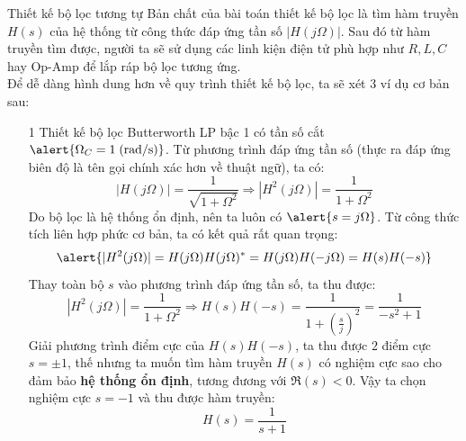 \documentclass[8pt]{beamer}
\begin{document}
\begin{frame}{Thiết kế bộ lọc tương tự}
	Bản chất của bài toán thiết kế bộ lọc là tìm \alert{hàm truyền $H(s)$} của hệ thống từ công thức đáp ứng tần số $|H(j\Omega)|$. Sau đó từ hàm truyền tìm được, người ta sẽ sử dụng các linh kiện điện tử phù hợp như $R,L,C$ hay Op-Amp để lắp ráp bộ lọc tương ứng.
\\ Để dễ dàng hình dung hơn về quy trình thiết kế bộ lọc, ta sẽ xét 3 ví dụ cơ bản sau:
\begin{enumerate}
	\item[1] Thiết kế bộ lọc Butterworth LP bậc 1 có tần số cắt $\alert{\Omega_{C}=1\;\text{(rad/s)}}$.
Từ phương trình đáp ứng tần số (thực ra đáp ứng biên độ là tên gọi chính xác hơn về thuật ngữ), ta có:
$$|H(j\Omega)|=\frac{1}{\sqrt{1+\Omega^2}}\Rightarrow |H^2(j\Omega)|=\frac{1}{1+\Omega^2}$$
Do bộ lọc là hệ thống ổn định, nên ta luôn có $\alert{s=j\Omega}$. Từ công thức tích liên hợp phức cơ bản, ta có kết quả rất quan trọng: $$\alert{|H^2(j\Omega)|=H(j\Omega)H(j\Omega)^*=H(j\Omega)H(-j\Omega)=H(s)H(-s)}$$
Thay toàn bộ $s$ vào phương trình đáp ứng tần số, ta thu được:
$$|H^2(j\Omega)|=\frac{1}{1+\Omega^2}\Rightarrow H(s)H(-s)=\frac{1}{1+\left(\frac{s}{j}\right)^2}=\frac{1}{-s^2+1}$$
Giải phương trình điểm cực của $H(s)H(-s)$, ta thu được $2$ điểm cực $s=\pm 1$, thế nhưng ta muốn tìm \alert{hàm truyền $H(s)$} có nghiệm cực sao cho đảm bảo \textbf{hệ thống ổn định}, tương đương với $\Re{(s)}<0$. Vậy ta chọn nghiệm cực $s=-1$ và thu được hàm truyền: $$H(s)=\frac{1}{s+1}$$
	\end{enumerate}

\end{frame}
\end{document}
